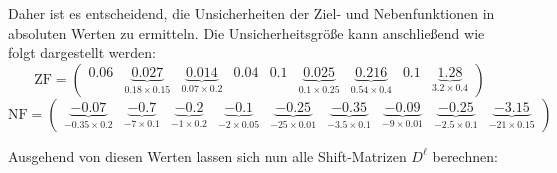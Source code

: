 \documentclass[a4paper,12pt]{article}
\begin{document}
Daher ist es entscheidend, die Unsicherheiten der Ziel- und Nebenfunktionen in absoluten Werten zu ermitteln. Die Unsicherheitsgr\"o\ss e kann anschlie\ss end wie folgt dargestellt werden:
\[
    \text{ZF} = \begin{pmatrix}
        0.06 & \underbrace{0.027}_{\mathrm{0.18 \times 0.15}} & \underbrace{0.014}_{\mathrm{0.07 \times 0.2}} & 0.04 & 0.1 & \underbrace{0.025}_{\mathrm{0.1 \times 0.25}} & \underbrace{0.216}_{\mathrm{0.54 \times 0.4}} & 0.1 & \underbrace{1.28}_{\mathrm{3.2 \times 0.4}}
    \end{pmatrix}        
\]
\[
    \text{NF} = \begin{pmatrix}
        \underbrace{-0.07}_{\mathrm{-0.35 \times 0.2}} & \underbrace{-0.7}_{\mathrm{-7 \times 0.1}} & \underbrace{-0.2}_{\mathrm{-1 \times 0.2}} & \underbrace{-0.1}_{\mathrm{-2 \times 0.05}} & \underbrace{-0.25}_{\mathrm{-25 \times 0.01}} & \underbrace{-0.35}_{\mathrm{-3.5 \times 0.1}} & \underbrace{-0.09}_{\mathrm{-9 \times 0.01}} & \underbrace{-0.25}_{\mathrm{-2.5 \times 0.1}} & \underbrace{-3.15}_{\mathrm{-21 \times 0.15}}
    \end{pmatrix}
\]

Ausgehend von diesen Werten lassen sich nun alle Shift-Matrizen $D^\ell$ berechnen:
\end{document}
